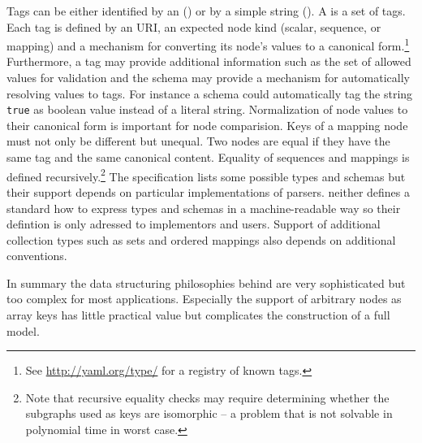 Tags can be either identified by an  
() or by a simple string ().
A  is a set of tags. Each tag is defined
by an URI, an expected node kind (scalar, sequence, or mapping) and a 
mechanism for converting its node's values to a canonical form.\footnote{See
\url{http://yaml.org/type/} for a registry of known tags.} Furthermore,
a tag may provide additional information such as the set of allowed values
for validation and the schema may provide a mechanism for automatically
resolving values to tags. For instance a schema could automatically 
tag the string \texttt{true} as boolean value instead of a literal string.
Normalization of node values to their canonical form is important for
node comparision. Keys of a mapping node must not only be different but 
unequal. Two nodes are equal if they have the same tag and the same 
canonical content. Equality of sequences and mappings is defined
recursively.\footnote{Note that recursive equality checks may require
determining whether the subgraphs used as keys are isomorphic -- a
problem that is not solvable in polynomial time in worst case.} 
The  specification lists some possible types and schemas
but their support depends on particular implementations of 
parsers.  neither defines a standard how to express types
and schemas in a machine-readable way so their defintion is only adressed
to implementors and users. Support of additional collection types such as 
sets and ordered mappings also depends on additional conventions.


In summary the data structuring philosophies behind  are very
sophisticated but too complex for most applications. Especially the support
of arbitrary nodes as array keys has little practical value but complicates
the construction of a full  model. 

